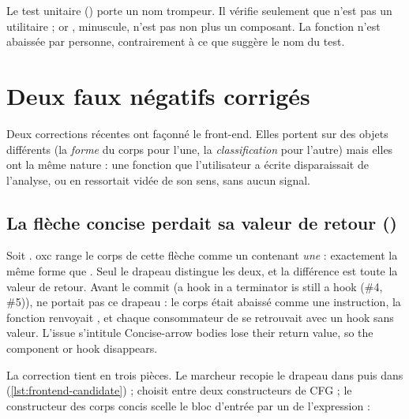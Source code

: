 \begin{piege}
Le test unitaire  () porte un nom trompeur. Il vérifie seulement que  n'est pas un utilitaire ; or , minuscule, n'est pas non plus un composant. La fonction n'est abaissée par personne, contrairement à ce que suggère le nom du test.
\end{piege}

\section{Deux faux négatifs corrigés}
\label{sec:frontend-fn-corriges}

Deux corrections récentes ont façonné le front-end. Elles portent sur des objets différents (la \emph{forme} du corps pour l'une, la \emph{classification} pour l'autre) mais elles ont la même nature : une fonction que l'utilisateur a écrite disparaissait de l'analyse, ou en ressortait vidée de son sens, sans aucun signal.

\subsection{La flèche concise perdait sa valeur de retour ()}

Soit . oxc range le corps de cette flèche comme un  contenant \emph{une}  : exactement la même forme que . Seul le drapeau  distingue les deux, et la différence est toute la valeur de retour. Avant le commit  (\og a hook in a terminator is still a hook (\#4, \#5)\fg{}),  ne portait pas ce drapeau : le corps était abaissé comme une instruction, la fonction renvoyait , et chaque consommateur de  se retrouvait avec un hook sans valeur. L'issue s'intitule \og Concise-arrow bodies lose their return value, so the component or hook disappears\fg{}.

La correction tient en trois pièces. Le marcheur recopie le drapeau dans  puis dans  (\cref{lst:frontend-candidate}) ;  choisit entre deux constructeurs de CFG ; le constructeur des corps concis scelle le bloc d'entrée par un  de l'expression :

